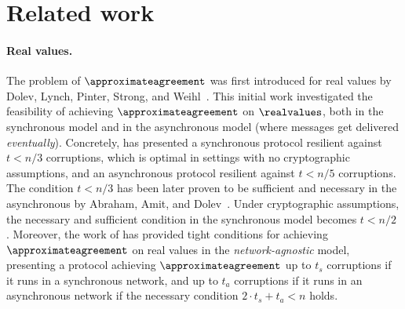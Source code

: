 \section{Related work}
\paragraph{Real values.}
The problem of $\approximateagreement$ was first introduced for real values by Dolev, Lynch, Pinter, Strong, and Weihl~\cite{JACM:DLPSW86}. This initial work investigated the feasibility of achieving $\approximateagreement$ on $\realvalues$, both in the synchronous model and in the asynchronous model (where messages get delivered \emph{eventually}). Concretely, \cite{JACM:DLPSW86} has presented a synchronous protocol resilient against $t < n / 3$ corruptions, which is optimal in settings with no cryptographic assumptions, and an asynchronous protocol resilient against $t < n/5$ corruptions. The condition $t < n / 3$ has been later proven to be sufficient and necessary in the asynchronous by Abraham, Amit, and Dolev~\cite{OPODIS:AAD04}. Under cryptographic assumptions, the necessary and sufficient condition in the synchronous model becomes $t < n / 2$ \cite{PODC:GhLiWa22, PODC:LenLos22}. Moreover, the work of \cite{PODC:GhLiWa22} has provided tight conditions for achieving $\approximateagreement$ on real values in the \emph{network-agnostic} model, presenting a protocol achieving $\approximateagreement$ up to $t_s$ corruptions if it runs in a synchronous network, and up to $t_a$ corruptions if it runs in an asynchronous network if the necessary condition $2 \cdot t_s + t_a < n$ holds.

